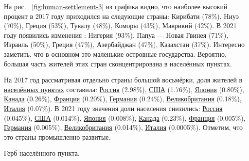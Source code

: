 На рис. ~\ref{fig:human-settlement-3} из графика видно, что наиболее высокий процент в 2017 году приходился на следующие страны: Кирибати (78\%), Ниуэ (70\%), Греция (53\%), Тувалу (48\%), Коморы (43\%), Маврикий (42\%). В 2021 году появились изменения : Нигерия (93\%), Папуа — Новая Гвинея (71\%), Израиль (50\%), Греция (47\%), Азербайджан (47\%), Казахстан (37\%). Интересно заметить, что в основном это маленькие островные государства. Вероятно, большая часть жителей этих стран сконцентрирована в населённых пунктах.

На 2017 год рассматривая отдельно страны большой восьмёрки, доля жителей в \href{http://www.wikidata.org/entity/Q486972}{населённых пунктах} составила: \href{http://www.wikidata.org/entity/Q159}{Россия} (\num{2.98}\%), \href{http://www.wikidata.org/entity/Q30}{США} (\num{1.76}\%), \href{http://www.wikidata.org/entity/Q17}{Япония} (\num{0.80}\%), \href{http://www.wikidata.org/entity/Q16}{Канада} (\num{0.26}\%), \href{http://www.wikidata.org/entity/Q142}{Франция} (\num{0.20}\%), \href{http://www.wikidata.org/entity/Q183}{Германия} (\num{0.24}\%), \href{http://www.wikidata.org/entity/Q145}{Великобритания} (\num{0.18}\%), \href{http://www.wikidata.org/entity/Q38}{Италия} (\num{0.07}\%). В 2021 году значения доли населения снизились: \href{http://www.wikidata.org/entity/Q159}{Россия} (0.045\%), \href{http://www.wikidata.org/entity/Q30}{США} (\num{0.014}\%), \href{http://www.wikidata.org/entity/Q17}{Япония} (\num{0.008}\%), \href{http://www.wikidata.org/entity/Q16}{Канада} (\num{0.23}\%), \href{http://www.wikidata.org/entity/Q142}{Франция} (\num{0.005}\%), \href{http://www.wikidata.org/entity/Q183}{Германия} (\num{0.005}\%), \href{http://www.wikidata.org/entity/Q145}{Великобритания} (\num{0.014}\%), \href{http://www.wikidata.org/entity/Q38}{Италия} (\num{0.0005}\%). Отметим, что это страны промышленно развитые.

\begin{marginfigure}[0.0cm]
{
\setlength{\fboxsep}{0pt}%
\setlength{\fboxrule}{1pt}%
%
}
  \caption{Герб населённого пункта.}%
  \label{fig:flag_question_human_settlements4}%
\end{marginfigure}


